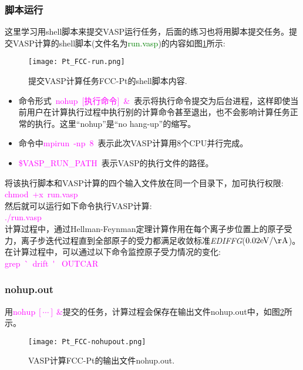 \subsubsection{脚本运行}
这里学习用\textrm{shell}脚本来提交\textrm{VASP}运行任务，后面的练习也将用脚本提交任务。提交\textrm{VASP}计算的\textrm{shell}脚本(文件名为\textcolor{green}{\textrm{run.vasp}})的内容如图\ref{Pt_FCC:run}所示:
\begin{figure}[h!]
\centering
\vskip -12pt
\texttt{[image: Pt\_FCC-run.png]}
\caption{\small 提交\textrm{VASP}计算任务\textrm{FCC-Pt}的\textrm{shell}脚本内容.}%
\label{Pt_FCC:run}
\end{figure}
	\begin{itemize}
		\item 命令形式\textcolor{magenta}{~\textrm{nohup}~[执行命令]~\&~}表示将执行命令提交为后台进程，这样即使当前用户在计算执行过程中执行别的计算命令甚至退出，也不会影响计算任务正常的执行。这里\textrm{``nohup''}是\textrm{``no hang-up''}的缩写。
		\item 命令中\textcolor{magenta}{\textrm{mpirun~-np~8~}}表示此次\textrm{VASP}计算用8个\textrm{CPU}并行完成。
		\item \textcolor{magenta}{\$\textrm{VASP\_RUN\_PATH~}}表示\textrm{VASP}的执行文件的路径。
	\end{itemize}
将该执行脚本和\textrm{VASP}计算的四个输入文件放在同一个目录下，加可执行权限:~\\
\textcolor{magenta}{chmod~+x~run.vasp}\\%
然后就可以运行如下命令执行\textrm{VASP}计算:\\
	\textcolor{magenta}{./run.vasp }\\
		计算过程中，通过\textrm{Hellman-Feynman}定理计算作用在每个离子步位置上的原子受力，离子步迭代过程直到全部原子的受力都满足收敛标准\textit{EDIFFG}($0.02\mathrm{eV/\AA}$)。在计算过程中，可以通过以下命令监控原子受力情况的变化:\\
		\textcolor{magenta}{grep~\`~drift~\'~ OUTCAR}
\subsubsection{\rm{nohup.out}}
用\textcolor{magenta}{$\mathrm{nohup}~[\cdots]~\&$}提交的任务，计算过程会保存在输出文件\textrm{nohup.out}中，如图\ref{Pt_FCC:nohupout}所示。
\begin{figure}[h!]
\centering
\texttt{[image: Pt\_FCC-nohupout.png]}
\caption{\small \textrm{VASP}计算\textrm{FCC-Pt}的输出文件\textrm{nohup.out}.}%
\label{Pt_FCC:nohupout}
\end{figure}

